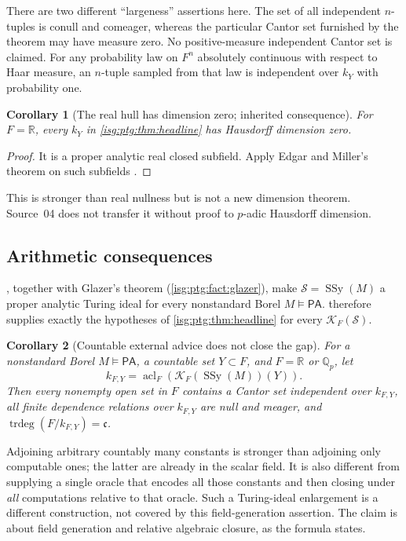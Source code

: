 \documentclass[11pt]{article}
\newtheorem{corollary}[corollary]{Corollary}
\theoremstyle{definition}
\theoremstyle{remark}
\newcommand{\R}{\mathbb{R}}
\newcommand{\Qp}{\mathbb{Q}_p}
\newcommand{\PA}{\mathsf{PA}}
\newcommand{\SSy}{\operatorname{SSy}}
\newcommand{\acl}{\operatorname{acl}}
\newcommand{\trdeg}{\operatorname{trdeg}}
\newcommand{\cfrak}{\mathfrak{c}}
\begin{document}
There are two different ``largeness'' assertions here. The set of all
independent $n$-tuples is conull and comeager, whereas the particular
Cantor set furnished by the theorem may have measure zero. No
positive-measure independent Cantor set is claimed. For any probability law
on $F^n$ absolutely continuous with respect to Haar measure, an $n$-tuple
sampled from that law is independent over $k_Y$ with probability one.

\begin{corollary}[The real hull has dimension zero; inherited consequence]\label{isg:ptg:cor:dimension}
For $F=\R$, every $k_Y$ in \cref{isg:ptg:thm:headline} has Hausdorff
dimension zero.
\end{corollary}
\begin{proof}
It is a proper analytic real closed subfield. Apply Edgar and Miller's
theorem on such subfields \cite{EdgarMiller}.
\end{proof}

This is stronger than real nullness but is not a new dimension theorem.
Source~04 does not transfer it without proof to $p$-adic Hausdorff
dimension.

\subsection{Arithmetic consequences}
, together with Glazer's
theorem (\cref{isg:ptg:fact:glazer}), make $\mathcal S=\SSy(M)$ a proper
analytic Turing ideal for every nonstandard Borel $M\models\PA$.
 therefore supplies exactly the hypotheses of
\cref{isg:ptg:thm:headline} for every $\mathcal K_F(\mathcal S)$.

\begin{corollary}[Countable external advice does not close the gap]\label{isg:ptg:cor:advice}
For a nonstandard Borel $M\models\PA$, a countable set $Y\subset F$, and
$F=\R$ or $\Qp$, let
\[
 k_{F,Y}=\acl_F(\mathcal K_F(\SSy(M))(Y)).
\]
Then every nonempty open set in $F$ contains a Cantor set independent over
$k_{F,Y}$, all finite dependence relations over $k_{F,Y}$ are null and
meager, and $\trdeg(F/k_{F,Y})=\cfrak$.
\end{corollary}

Adjoining arbitrary countably many constants is stronger than adjoining
only computable ones; the latter are already in the scalar field. It is
also different from supplying a single oracle that encodes all those
constants and then closing under \emph{all} computations relative to that
oracle. Such a Turing-ideal enlargement is a different construction, not
covered by this field-generation assertion. The claim is about field
generation and relative algebraic closure, as the formula states.
\end{document}
